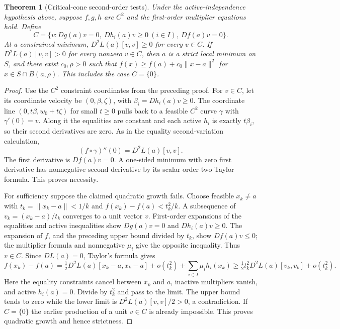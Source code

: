 \documentclass[11pt,oneside,openany]{book}
\newtheorem{theorem}{Theorem}[chapter]
\theoremstyle{definition}
\theoremstyle{remark}
\newcommand{\norm}[1]{\lVert#1\rVert}
\begin{document}
\begin{theorem}[Critical-cone second-order tests]\label{d04:05:critical-cone}
Under the active-independence hypothesis above, suppose $f,g,h$ are $C^2$
and the first-order multiplier equations hold. Define
\[
 C=\{v:Dg(a)v=0,\ Dh_i(a)v\geq0\ (i\in I),\ Df(a)v=0\}.
\]
At a constrained minimum, $D^2L(a)[v,v]\geq0$ for every $v\in C$.
If $D^2L(a)[v,v]>0$ for every nonzero $v\in C$, then $a$ is a strict
local minimum on $S$, and there exist $c_0,\rho>0$ such that
$f(x)\geq f(a)+c_0\norm{x-a}^2$ for $x\in S\cap B(a,\rho)$.
This includes the case $C=\{0\}$.
\end{theorem}
\begin{proof}
Use the $C^2$ constraint coordinates from the preceding proof. For
$v\in C$, let its coordinate velocity be $(0,\beta,\zeta)$, with
$\beta_i=Dh_i(a)v\geq0$. The coordinate line
$(0,t\beta,w_0+t\zeta)$ for small $t\geq0$ pulls back to a feasible
$C^2$ curve $\gamma$ with $\gamma'(0)=v$. Along it the equalities are
constant and each active $h_i$ is exactly $t\beta_i$, so their second
derivatives are zero. As in the equality second-variation calculation,
\[
 (f\circ\gamma)''(0)=D^2L(a)[v,v].
\]
The first derivative is $Df(a)v=0$. A one-sided minimum with zero first
derivative has nonnegative second derivative by its scalar order-two
Taylor formula. This proves necessity.

For sufficiency suppose the claimed quadratic growth fails. Choose feasible
$x_k\ne a$ with $t_k=\norm{x_k-a}<1/k$ and
$f(x_k)-f(a)<t_k^2/k$. A subsequence of
$v_k=(x_k-a)/t_k$ converges to a unit vector $v$. First-order expansions
of the equalities and active inequalities show
$Dg(a)v=0$ and $Dh_i(a)v\geq0$. The expansion of $f$, and the preceding
upper bound divided by $t_k$, show $Df(a)v\leq0$; the multiplier formula
and nonnegative $\mu_i$ give the opposite inequality. Thus $v\in C$.
Since $DL(a)=0$, Taylor's formula gives
\[
 f(x_k)-f(a)
 =\tfrac12D^2L(a)[x_k-a,x_k-a]+o(t_k^2)
                  +\sum_{i\in I}\mu_i h_i(x_k)
 \geq\tfrac12t_k^2D^2L(a)[v_k,v_k]+o(t_k^2).
\]
Here the equality constraints cancel between $x_k$ and $a$, inactive
multipliers vanish, and active $h_i(a)=0$. Divide by $t_k^2$ and pass
to the limit. The upper bound tends to zero while the lower limit is
$D^2L(a)[v,v]/2>0$, a contradiction. If $C=\{0\}$ the earlier production
of a unit $v\in C$ is already impossible. This proves quadratic growth
and hence strictness.
\end{proof}
\end{document}
